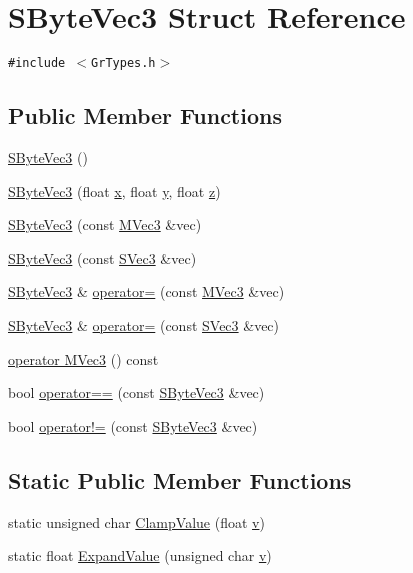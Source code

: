 \hypertarget{struct_s_byte_vec3}{
\section{SByteVec3 Struct Reference}
\label{struct_s_byte_vec3}
}
{\tt \#include $<$GrTypes.h$>$}

\subsection*{Public Member Functions}
\begin{CompactItemize}
\item 
\hyperlink{struct_s_byte_vec3_0d8c4c957ad3a2d9be320e0dc137feba}{SByteVec3} ()
\item 
\hyperlink{struct_s_byte_vec3_a6116e44a4c8a4c480476627e86712d6}{SByteVec3} (float \hyperlink{struct_s_byte_vec3_ff06077b908dd9cabe5013c34ef711b2}{x}, float \hyperlink{struct_s_byte_vec3_0bd69fe349fb5b25a6f8db9c16a3290f}{y}, float \hyperlink{struct_s_byte_vec3_384e36ccc97f776513293e7132ac1338}{z})
\item 
\hyperlink{struct_s_byte_vec3_2bdfc0f62f2e795a1f975b41663fefe7}{SByteVec3} (const \hyperlink{class_m_vec3}{MVec3} \&vec)
\item 
\hyperlink{struct_s_byte_vec3_5a1ecf2144ee07a0eac71d4aa3bf9a4f}{SByteVec3} (const \hyperlink{struct_s_vec3}{SVec3} \&vec)
\item 
\hyperlink{struct_s_byte_vec3}{SByteVec3} \& \hyperlink{struct_s_byte_vec3_62a3432f195e528460871140d0660190}{operator=} (const \hyperlink{class_m_vec3}{MVec3} \&vec)
\item 
\hyperlink{struct_s_byte_vec3}{SByteVec3} \& \hyperlink{struct_s_byte_vec3_128ca7dac0e6f8e9d785bc9516048749}{operator=} (const \hyperlink{struct_s_vec3}{SVec3} \&vec)
\item 
\hyperlink{struct_s_byte_vec3_a4af393753cc8e38c7c7626f6a86d07c}{operator MVec3} () const 
\item 
bool \hyperlink{struct_s_byte_vec3_29592cde1e99e930b9a0ee4dc5f11661}{operator==} (const \hyperlink{struct_s_byte_vec3}{SByteVec3} \&vec)
\item 
bool \hyperlink{struct_s_byte_vec3_c40cf24b6748330b9b70bf2de1534254}{operator!=} (const \hyperlink{struct_s_byte_vec3}{SByteVec3} \&vec)
\end{CompactItemize}
\subsection*{Static Public Member Functions}
\begin{CompactItemize}
\item 
static unsigned char \hyperlink{struct_s_byte_vec3_d5ff95d8fb95b7ef2abd7cbb94612bdf}{ClampValue} (float \hyperlink{glext__bak_8h_5cf89b94f7478c0ebc4429b60e7ef93b}{v})
\item 
static float \hyperlink{struct_s_byte_vec3_b119526770f65b889e2fc32ad23180b0}{ExpandValue} (unsigned char \hyperlink{glext__bak_8h_5cf89b94f7478c0ebc4429b60e7ef93b}{v})
\end{CompactItemize}
